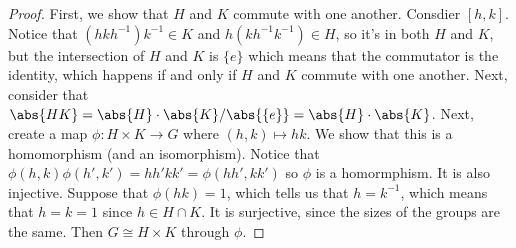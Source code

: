 \begin{proof}
First, we show that $H$ and $K$ commute with one another. Consdier $[h,k]$. Notice that $(hkh^{-1})k^{-1} \in K$ and  $h(kh^{-1}k^{-1}) \in H$, so it's in both $H$ and $K$, but the intersection of $H$ and $K$ is $\{e\}$ which means that the commutator is the identity, which happens if and only if $H$ and $K$ commute with one another. Next, consider that $\abs{HK} = \abs{H}\cdot\abs{K}/ \abs{\{e\}} = \abs{H} \cdot \abs{K}$. Next, create a map $\phi : H \times K \to G$ where $(h,k) \mapsto hk$. We show that this is a homomorphism (and an isomorphism). Notice that $\phi(h,k)\phi(h',k') = hh'kk' = \phi(hh',kk')$ so $\phi$ is a homormphism. It is also injective. Suppose that $\phi(hk) = 1$, which tells us that $h = k^{-1}$, which means that $h = k = 1$ since $h \in H \cap K$. It is surjective, since the sizes of the groups are the same. Then $G \cong H \times K$ through $\phi$.
\end{proof}



